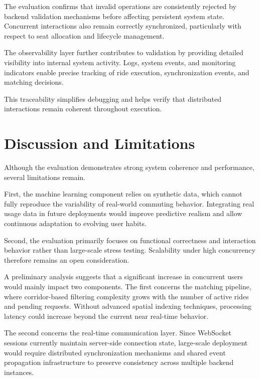 The evaluation confirms that invalid operations are consistently rejected by backend validation mechanisms before affecting persistent system state. Concurrent interactions also remain correctly synchronized, particularly with respect to seat allocation and lifecycle management.

The observability layer further contributes to validation by providing detailed visibility into internal system activity. Logs, system events, and monitoring indicators enable precise tracking of ride execution, synchronization events, and matching decisions.

This traceability simplifies debugging and helps verify that distributed interactions remain coherent throughout execution.


\section{Discussion and Limitations}

Although the evaluation demonstrates strong system coherence and performance, several limitations remain.

First, the machine learning component relies on synthetic data, which cannot fully reproduce the variability of real-world commuting behavior. Integrating real usage data in future deployments would improve predictive realism and allow continuous adaptation to evolving user habits.

Second, the evaluation primarily focuses on functional correctness and interaction behavior rather than large-scale stress testing. Scalability under high concurrency therefore remains an open consideration.

A preliminary analysis suggests that a significant increase in concurrent users would mainly impact two components. The first concerns the matching pipeline, where corridor-based filtering complexity grows with the number of active rides and pending requests. Without advanced spatial indexing techniques, processing latency could increase beyond the current near real-time behavior.

The second concerns the real-time communication layer. Since WebSocket sessions currently maintain server-side connection state, large-scale deployment would require distributed synchronization mechanisms and shared event propagation infrastructure to preserve consistency across multiple backend instances.

